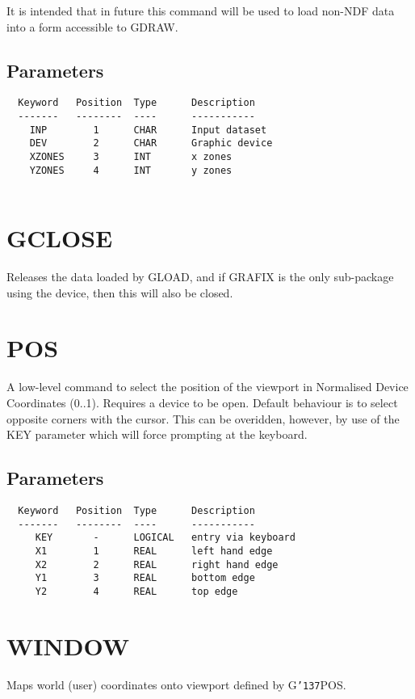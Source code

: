 \documentclass{book}
\renewcommand{\_}{{\tt\char'137}}     %
\begin{document}
It is intended that in future this command will be used to load
non-NDF data into a form accessible to GDRAW.
 
\subsection{Parameters}
\begin{verbatim}
  Keyword   Position  Type      Description
  -------   --------  ----      -----------
    INP        1      CHAR      Input dataset
    DEV        2      CHAR      Graphic device
    XZONES     3      INT       x zones
    YZONES     4      INT       y zones
 
\end{verbatim}\section{GCLOSE}
Releases the data loaded by GLOAD, and if GRAFIX is the only
sub-package using the device, then this will also be closed.
 
\section{POS}
A low-level command to select the position of the viewport in Normalised
Device Coordinates (0..1). Requires a device to be open. Default
behaviour is to select opposite corners with the cursor. This can
be overidden, however, by use of the KEY parameter which will force
prompting at the keyboard.
 
\subsection{Parameters}
\begin{verbatim}
  Keyword   Position  Type      Description
  -------   --------  ----      -----------
     KEY       -      LOGICAL   entry via keyboard
     X1        1      REAL      left hand edge
     X2        2      REAL      right hand edge
     Y1        3      REAL      bottom edge
     Y2        4      REAL      top edge
\end{verbatim}\section{WINDOW}
Maps world (user) coordinates onto viewport defined by G\_POS.
 
\end{document}
